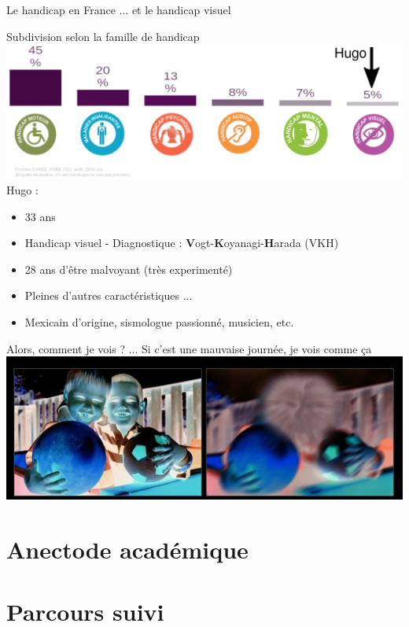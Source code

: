 \documentclass{beamer}
\begin{document}
\begin{frame}
 {Le handicap en France ... et le handicap visuel } 

 \vskip -0.2cm \small Subdivision selon la famille de handicap \\
 \vskip 0.2cm
    \includegraphics[width=1\linewidth]{images/handicaps.png} \\
\vskip -0.5cm Hugo : \pause
\vskip -0.2cm \begin{itemize}
 \item 33 ans \pause
 \item Handicap visuel - Diagnostique : \textbf{V}ogt-\textbf{K}oyanagi-\textbf{H}arada (VKH) \pause
 \item 28 ans d'être malvoyant (très experimenté) \pause 
 \item Pleines d'autres caractéristiques ... \pause 
 \item Mexicain d'origine, sismologue passionné, musicien, etc. \pause
\end{itemize}


 
\end{frame}

\begin{frame}
 
 \vskip -0.4cm \small Alors, comment je vois ? ... Si c'est une mauvaise journ\'ee, je vois comme ça  \vskip 0.1cm
 \centering \includegraphics[width=0.75\linewidth]{images/visual_problem_neg.png}
 
\end{frame}



\section{Anectode acad\'emique}


\section{Parcours suivi}
\end{document}
